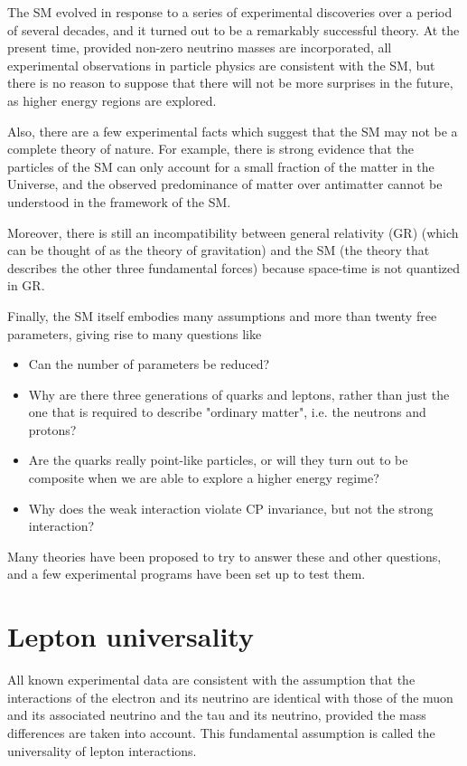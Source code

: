 The SM evolved in response to a series of experimental discoveries over a period of several decades, and it turned out to be a remarkably successful theory. At the present time, provided non-zero neutrino masses are incorporated, all experimental observations in particle physics are consistent with the SM, but there is no reason to suppose that there will not be more surprises in the future, as higher energy regions are explored.

Also, there are a few experimental facts which suggest that the SM may not be a complete theory of nature. For example, there is strong evidence that the particles of the SM can only account for a small fraction of the matter in the Universe, and the observed predominance of matter over antimatter cannot be understood in the framework of the SM.

Moreover, there is still an incompatibility between general relativity (GR) (which can be thought of as the theory of gravitation) and the SM (the theory that describes the other three fundamental forces) because space-time is not quantized in GR.

Finally, the SM itself embodies many assumptions and more than twenty free parameters, giving rise to many questions like

\begin{itemize}
 \item Can the number of parameters be reduced?
 \item Why are there three generations of quarks and leptons, rather than just the one that is required to describe "ordinary matter", i.e. the neutrons and protons?
 \item Are the quarks really point-like particles, or will they turn out to be composite when we are able to explore a higher energy regime?
 \item Why does the weak interaction violate CP invariance, but not the strong interaction?
\end{itemize}

Many theories have been proposed to try to answer these and other questions, and a few experimental programs have been set up to test them. %

\section{Lepton universality}
	All known experimental data are consistent with the assumption that the interactions of the electron and its neutrino are identical with those of the muon and its associated neutrino and the tau and its neutrino, provided the mass differences are taken into account. This fundamental assumption is called the universality of lepton interactions.

